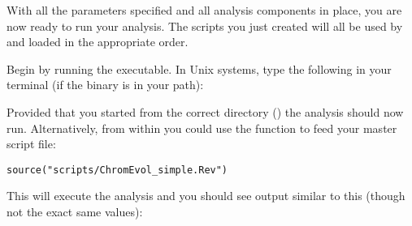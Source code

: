 With all the parameters specified and all analysis components in place, you are now ready to run your analysis. 
The \Rev scripts you just created will all be used by \RevBayes and loaded in the appropriate order.

{\begin{framed}
Begin by running the \RevBayes executable. In Unix systems, type the following in your terminal (if the \RevBayes binary is in your path):

\colorbox{black}{\strut\hspace{1mm}\textcolor[rgb]{0,1,1}{}\hspace{0.6\textwidth}}
\end{framed}}

Provided that you started \RevBayes from the correct directory () the analysis should now run. Alternatively, from within \RevBayes you could use the  function to feed \RevBayes your master script file:
{\tt \begin{snugshade*}
\begin{lstlisting}
source("scripts/ChromEvol_simple.Rev")
\end{lstlisting}
\end{snugshade*}}

This will execute the analysis and you should see output similar to this (though not the exact same values):


